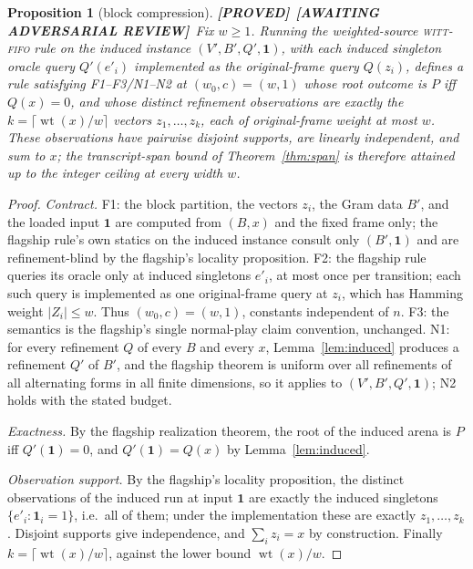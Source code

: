 \documentclass[11pt]{article}
\newtheorem{proposition}[theorem]{Proposition}
\theoremstyle{definition}
\theoremstyle{remark}
\newcommand{\wt}{\operatorname{wt}}
\newcommand{\taglabel}[1]{\textnormal{\textbf{[#1]}}}
\newcommand{\PROVED}{\taglabel{PROVED}}
\newcommand{\UNREVIEWED}{\taglabel{AWAITING ADVERSARIAL REVIEW}}
\begin{document}
\begin{proposition}[block compression]\label{prop:block}
\PROVED\ \UNREVIEWED\
Fix $w\geq1$.  Running the weighted-source \textsc{witt-fifo} rule on
the induced instance $(V',B',Q',\mathbf{1})$, with each induced
singleton oracle query $Q'(e'_i)$ implemented as the original-frame
query $Q(z_i)$, defines a rule satisfying F1--F3/N1--N2 at
$(w_0,c)=(w,1)$ whose root outcome is $P$ iff $Q(x)=0$, and whose
distinct refinement observations are exactly the $k=\lceil\wt(x)/w\rceil$
vectors $z_1,\dots,z_k$, each of original-frame weight at most $w$.
These observations have pairwise disjoint supports, are linearly
independent, and sum to $x$; the transcript-span bound of
Theorem~\ref{thm:span} is therefore attained up to the integer ceiling
at every width $w$.
\end{proposition}

\begin{proof}
\emph{Contract.}  F1: the block partition, the vectors $z_i$, the Gram
data $B'$, and the loaded input $\mathbf{1}$ are computed from $(B,x)$
and the fixed frame only; the flagship rule's own statics on the induced
instance consult only $(B',\mathbf{1})$ and are refinement-blind by the
flagship's locality proposition.  F2: the flagship rule queries its
oracle only at induced singletons $e'_i$, at most once per transition;
each such query is implemented as one original-frame query at $z_i$,
which has Hamming weight $|Z_i|\leq w$.  Thus $(w_0,c)=(w,1)$, constants
independent of $n$.  F3: the semantics is the flagship's single
normal-play claim convention, unchanged.  N1: for every refinement $Q$
of every $B$ and every $x$, Lemma~\ref{lem:induced} produces a
refinement $Q'$ of $B'$, and the flagship theorem is uniform over all
refinements of all alternating forms in all finite dimensions, so it
applies to $(V',B',Q',\mathbf{1})$; N2 holds with the stated budget.

\emph{Exactness.}  By the flagship realization theorem, the root of the
induced arena is $P$ iff $Q'(\mathbf{1})=0$, and
$Q'(\mathbf{1})=Q(x)$ by Lemma~\ref{lem:induced}.

\emph{Observation support.}  By the flagship's locality proposition, the
distinct observations of the induced run at input $\mathbf{1}$ are
exactly the induced singletons $\{e'_i:\mathbf{1}_i=1\}$, i.e.\ all of
them; under the implementation these are exactly $z_1,\dots,z_k$.
Disjoint supports give independence, and $\sum_iz_i=x$ by construction.
Finally $k=\lceil\wt(x)/w\rceil$, against the lower bound
$\wt(x)/w$.
\end{proof}
\end{document}
